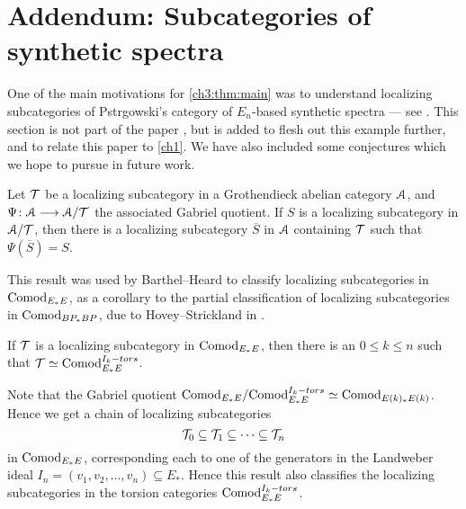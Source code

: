 
\section{Addendum: Subcategories of synthetic spectra}

One of the main motivations for \cref{ch3:thm:main} was to understand localizing subcategories of Pstr\a{}gowski's category of $E_n$-based synthetic spectra --- see \cite{pstragowski_2022}. This section is not part of the paper \cite{aambo_2024_localizing}, but is added to flesh out this example further, and to relate this paper to \cref{ch1}. We have also included some conjectures which we hope to pursue in future work. 

\begin{proposition}
    Let $\mathcal{T}$ be a localizing subcategory in a Grothendieck abelian category $\EuScript{A}$, and $\Psi\colon\EuScript{A}\longrightarrow \EuScript{A}/\mathcal{T}$ the associated Gabriel quotient. If $S$ is a localizing subcategory in $\EuScript{A}/\mathcal{T}$, then there is a localizing subcategory $\overline{S}$ in $\EuScript{A}$ containing $\mathcal{T}$ such that $\Psi(\overline{S})=S$. 
\end{proposition}

This result was used by Barthel--Heard to classify localizing subcategories in $\mathrm{Comod}_{E_*E}$, as a corollary to the partial classification of localizing subcategories in $\mathrm{Comod}_{BP_*BP}$, due to Hovey--Strickland in \cite{hovey-strickland_2005a}. 

\begin{theorem}
    \label{thm:classification-of-HTTs}
    If $\mathcal{T}$ is a localizing subcategory in $\mathrm{Comod}_{E_*E}$, then there is an $0\leq k\leq n$ such that $\mathcal{T} \simeq \mathrm{Comod}_{E_*E}^{I_k-tors}$. 
\end{theorem}

\begin{remark}
    Note that the Gabriel quotient $\mathrm{Comod}_{E_*E}/\mathrm{Comod}_{E_*E}^{I_k-tors}\simeq \mathrm{Comod}_{E(k)_*E(k)}$. Hence we get a chain of localizing subcategories
    \[\mathcal{T}_0 \subseteq \mathcal{T}_1\subseteq \cdots \subseteq \mathcal{T}_n \]
    in $\mathrm{Comod}_{E_*E}$, corresponding each to one of the generators in the Landweber ideal $I_n=(v_1, v_2, \ldots, v_n)\subseteq E_*$. Hence this result also classifies the localizing subcategories in the torsion categories $\mathrm{Comod}_{E_*E}^{I_k-tors}$. 
\end{remark}

